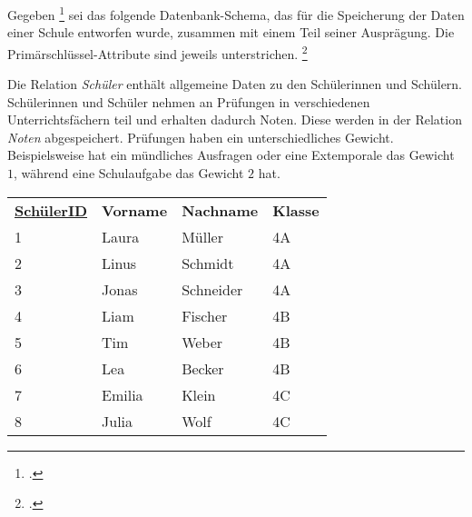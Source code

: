 \documentclass{bschlangaul-aufgabe}
\begin{document}

\let\f=\textbf
\let\u=\underline

Gegeben \footcite{examen:46116:2018:09} sei das folgende
Datenbank-Schema, das für die Speicherung der Daten einer Schule
entworfen wurde, zusammen mit einem Teil seiner Ausprägung. Die
Primärschlüssel-Attribute sind jeweils unterstrichen.
\footcite{db:ab:3}

Die Relation \emph{Schüler} enthält allgemeine Daten zu den Schülerinnen
und Schülern. Schülerinnen und Schüler nehmen an Prüfungen in
verschiedenen Unterrichtsfächern teil und erhalten dadurch Noten. Diese
werden in der Relation \emph{Noten} abgespeichert. Prüfungen haben ein
unterschiedliches Gewicht. Beispielsweise hat ein mündliches Ausfragen
oder eine Extemporale das Gewicht $1$, während eine Schulaufgabe das
Gewicht $2$ hat.


\begin{center}
\begin{tabular}{|llll|}
\hline
\f{\u{SchülerID}} & \f{Vorname} & \f{Nachname}  & \f{Klasse} \\
1                 & Laura       & Müller        & 4A         \\
2                 & Linus       & Schmidt       & 4A         \\
3                 & Jonas       & Schneider     & 4A         \\
4                 & Liam        & Fischer       & 4B         \\
5                 & Tim         & Weber         & 4B         \\
6                 & Lea         & Becker        & 4B         \\
7                 & Emilia      & Klein         & 4C         \\
8                 & Julia       & Wolf          & 4C         \\
\hline
\end{tabular}
\end{center}
\end{document}
